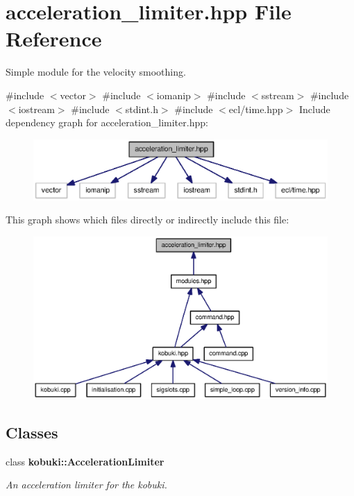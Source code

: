 \section{acceleration\-\_\-limiter.\-hpp \-File \-Reference}
\label{acceleration__limiter_8hpp}


\-Simple module for the velocity smoothing.  


{\ttfamily \#include $<$vector$>$}\*
{\ttfamily \#include $<$iomanip$>$}\*
{\ttfamily \#include $<$sstream$>$}\*
{\ttfamily \#include $<$iostream$>$}\*
{\ttfamily \#include $<$stdint.\-h$>$}\*
{\ttfamily \#include $<$ecl/time.\-hpp$>$}\*
\-Include dependency graph for acceleration\-\_\-limiter.\-hpp\-:
\nopagebreak
\begin{figure}[H]
\begin{center}
\leavevmode
\includegraphics[width=350pt]{acceleration__limiter_8hpp__incl}
\end{center}
\end{figure}
\-This graph shows which files directly or indirectly include this file\-:
\nopagebreak
\begin{figure}[H]
\begin{center}
\leavevmode
\includegraphics[width=350pt]{acceleration__limiter_8hpp__dep__incl}
\end{center}
\end{figure}
\subsection*{\-Classes}
\begin{DoxyCompactItemize}
\item 
class {\bf kobuki\-::\-Acceleration\-Limiter}
\begin{DoxyCompactList}\small\item\em \-An acceleration limiter for the kobuki. \end{DoxyCompactList}\end{DoxyCompactItemize}
